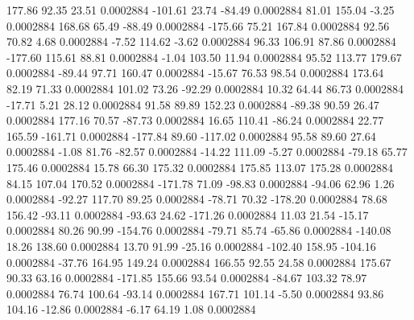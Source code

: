       177.86       92.35       23.51     0.0002884
     -101.61       23.74      -84.49     0.0002884
       81.01      155.04       -3.25     0.0002884
      168.68       65.49      -88.49     0.0002884
     -175.66       75.21      167.84     0.0002884
       92.56       70.82        4.68     0.0002884
       -7.52      114.62       -3.62     0.0002884
       96.33      106.91       87.86     0.0002884
     -177.60      115.61       88.81     0.0002884
       -1.04      103.50       11.94     0.0002884
       95.52      113.77      179.67     0.0002884
      -89.44       97.71      160.47     0.0002884
      -15.67       76.53       98.54     0.0002884
      173.64       82.19       71.33     0.0002884
      101.02       73.26      -92.29     0.0002884
       10.32       64.44       86.73     0.0002884
      -17.71        5.21       28.12     0.0002884
       91.58       89.89      152.23     0.0002884
      -89.38       90.59       26.47     0.0002884
      177.16       70.57      -87.73     0.0002884
       16.65      110.41      -86.24     0.0002884
       22.77      165.59     -161.71     0.0002884
     -177.84       89.60     -117.02     0.0002884
       95.58       89.60       27.64     0.0002884
       -1.08       81.76      -82.57     0.0002884
      -14.22      111.09       -5.27     0.0002884
      -79.18       65.77      175.46     0.0002884
       15.78       66.30      175.32     0.0002884
      175.85      113.07      175.28     0.0002884
       84.15      107.04      170.52     0.0002884
     -171.78       71.09      -98.83     0.0002884
      -94.06       62.96        1.26     0.0002884
      -92.27      117.70       89.25     0.0002884
      -78.71       70.32     -178.20     0.0002884
       78.68      156.42      -93.11     0.0002884
      -93.63       24.62     -171.26     0.0002884
       11.03       21.54      -15.17     0.0002884
       80.26       90.99     -154.76     0.0002884
      -79.71       85.74      -65.86     0.0002884
     -140.08       18.26      138.60     0.0002884
       13.70       91.99      -25.16     0.0002884
     -102.40      158.95     -104.16     0.0002884
      -37.76      164.95      149.24     0.0002884
      166.55       92.55       24.58     0.0002884
      175.67       90.33       63.16     0.0002884
     -171.85      155.66       93.54     0.0002884
      -84.67      103.32       78.97     0.0002884
       76.74      100.64      -93.14     0.0002884
      167.71      101.14       -5.50     0.0002884
       93.86      104.16      -12.86     0.0002884
       -6.17       64.19        1.08     0.0002884
